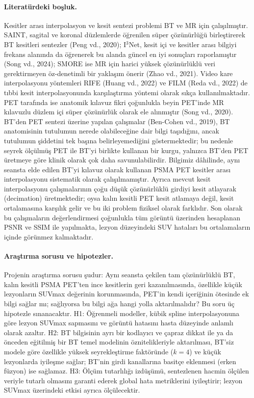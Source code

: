 \documentclass[11pt,a4paper]{article}
\begin{document}
\paragraph{Literatürdeki boşluk.} Kesitler arası interpolasyon ve kesit sentezi problemi BT ve
MR için çalışılmıştır. SAINT, sagital ve koronal düzlemlerde öğrenilen süper çözünürlüğü
birleştirerek BT kesitleri sentezler (Peng vd., 2020); I$^3$Net, kesit içi ve kesitler arası
bilgiyi frekans alanında da öğrenerek bu alanda güncel en iyi sonuçları raporlamıştır (Song vd.,
2024); SMORE ise MR için harici yüksek çözünürlüklü veri gerektirmeyen öz-denetimli bir yaklaşım
önerir (Zhao vd., 2021). Video kare interpolasyonu yöntemleri RIFE (Huang vd., 2022) ve FILM
(Reda vd., 2022) de tıbbi kesit interpolasyonunda karşılaştırma yöntemi olarak sıkça
kullanılmaktadır. PET tarafında ise anatomik kılavuz fikri çoğunlukla beyin PET'inde MR
kılavuzlu düzlem içi süper çözünürlük olarak ele alınmıştır (Song vd., 2020). BT'den PET sentezi
üzerine yapılan çalışmalar (Ben-Cohen vd., 2019), BT anatomisinin tutulumun nerede olabileceğine
dair bilgi taşıdığını, ancak tutulumun şiddetini tek başına belirleyemediğini göstermektedir; bu
nedenle seyrek ölçülmüş PET ile BT'yi birlikte kullanan bir kurgu, yalnızca BT'den PET üretmeye
göre klinik olarak çok daha savunulabilirdir. Bilgimiz dâhilinde, aynı seansta elde edilen BT'yi
kılavuz olarak kullanan PSMA PET kesitler arası interpolasyonu sistematik olarak
çalışılmamıştır. Ayrıca mevcut kesit interpolasyonu çalışmalarının çoğu düşük çözünürlüklü
girdiyi kesit atlayarak (decimation) üretmektedir; oysa kalın kesitli PET kesit atlamaya değil,
kesit ortalamasına karşılık gelir ve bu iki problem fiziksel olarak farklıdır. Son olarak bu
çalışmaların değerlendirmesi çoğunlukla tüm görüntü üzerinden hesaplanan PSNR ve SSIM ile
yapılmakta, lezyon düzeyindeki SUV hataları bu ortalamaların içinde görünmez kalmaktadır.

\paragraph{Araştırma sorusu ve hipotezler.} Projenin araştırma sorusu şudur: Aynı seansta
çekilen tam çözünürlüklü BT, kalın kesitli PSMA PET'ten ince kesitlerin geri kazanılmasında,
özellikle küçük lezyonların SUVmax değerinin korunmasında, PET'in kendi içeriğinin ötesinde ek
bilgi sağlar mı; sağlıyorsa bu bilgi ağa hangi yolla aktarılmalıdır? Bu soru üç hipotezle
sınanacaktır. H1: Öğrenmeli modeller, kübik spline interpolasyonuna göre lezyon SUVmax sapmasını
ve görüntü hatasını hasta düzeyinde anlamlı olarak azaltır. H2: BT bilgisinin ayrı bir kodlayıcı
ve çapraz dikkat ile ya da önceden eğitilmiş bir BT temel modelinin öznitelikleriyle aktarılması,
BT'siz modele göre özellikle yüksek seyrekleştirme faktöründe ($k = 4$) ve küçük lezyonlarda
iyileşme sağlar; BT'nin girdi kanallarına basitçe eklenmesi (erken füzyon) ise sağlamaz. H3:
Ölçüm tutarlılığı izdüşümü, sentezlenen hacmin ölçülen veriyle tutarlı olmasını garanti ederek
global hata metriklerini iyileştirir; lezyon SUVmax üzerindeki etkisi ayrıca ölçülecektir.
\end{document}
